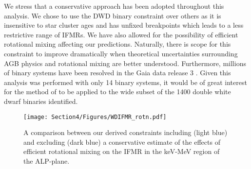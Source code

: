 
We stress that a conservative approach has been adopted throughout this analysis. We chose to use the DWD binary constraint \cite{Andrews} over others as it is insensitive to star cluster ages and has unfixed breakpoints which leads to a less restrictive range of IFMRs. We have also allowed for the possibility of efficient rotational mixing affecting our predictions. Naturally, there is scope for this constraint to improve dramatically when theoretical uncertainties surrounding AGB physics and rotational mixing are better understood. Furthermore, millions of binary systems have been resolved in the Gaia data release 3 \cite{2021arXiv210105282E}. Given this analysis was performed with only 14 binary systems, it would be of great interest for the method of \cite{Andrews} to be applied to the wide subset of the 1400 double white dwarf binaries identified.


\begin{figure}[t]
    \centering
    \texttt{[image: Section4/Figures/WDIFMR\_rotn.pdf]}
    \caption{A comparison between our derived constraints including (light blue) and excluding (dark blue) a conservative estimate of the effects of efficient rotational mixing on the IFMR in the keV-MeV region of the ALP-plane.}
    \label{fig: Rotn constraint}
\end{figure}